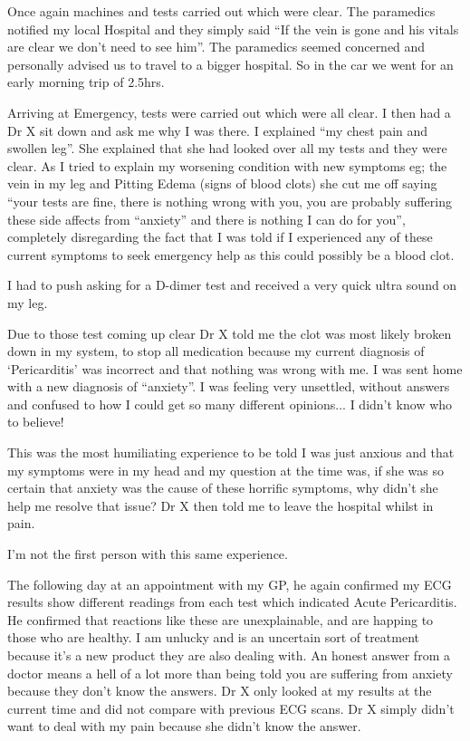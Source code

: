 Once again machines and tests carried out which were clear. The paramedics
notified my local Hospital and they simply said “If the vein is gone and his
vitals are clear we don’t need to see him”. The paramedics seemed concerned and
personally advised us to travel to a bigger hospital. So in the car we went for
an early morning trip of 2.5hrs.

Arriving at Emergency, tests were carried out which were all clear. I then had a
Dr X sit down and ask me why I was there. I explained ``my chest pain and
swollen leg''. She explained that she had looked over all my tests and they were
clear. As I tried to explain my worsening condition with new symptoms eg; the
vein in my leg and Pitting Edema (signs of blood clots) she cut me off saying
``your tests are fine, there is nothing wrong with you, you are probably
suffering these side affects from ``anxiety'' and there is nothing I can do for
you'', completely disregarding the fact that I was told if I experienced any of
these current symptoms to seek emergency help as this could possibly be a blood
clot.

I had to push asking for a D-dimer test and received a very quick ultra sound on
my leg.

Due to those test coming up clear Dr X told me the clot was most likely broken
down in my system, to stop all medication because my current diagnosis of
‘Pericarditis’ was incorrect and that nothing was wrong with me. I was sent home
with a new diagnosis of ``anxiety''. I was feeling very unsettled, without
answers and confused to how I could get so many different opinions... I didn’t
know who to believe!

This was the most humiliating experience to be told I was just anxious and that
my symptoms were in my head and my question at the time was, if she was so
certain that anxiety was the cause of these horrific symptoms, why didn’t she
help me resolve that issue? Dr X then told me to leave the hospital whilst in
pain.

I’m not the first person with this same experience.

The following day at an appointment with my GP, he again confirmed my ECG
results show different readings from each test which indicated Acute
Pericarditis. He confirmed that reactions like these are unexplainable, and are
happing to those who are healthy. I am unlucky and is an uncertain sort of
treatment because it’s a new product they are also dealing with. An honest
answer from a doctor means a hell of a lot more than being told you are
suffering from anxiety because they don’t know the answers. Dr X only looked at
my results at the current time and did not compare with previous ECG scans. Dr X
simply didn’t want to deal with my pain because she didn’t know the answer.

